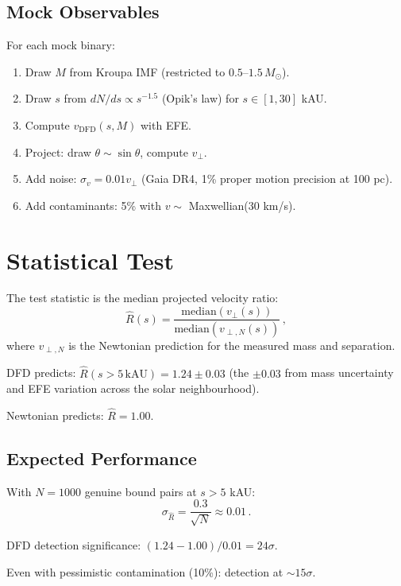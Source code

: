 \documentclass[11pt,a4paper]{article}
\begin{document}
\subsection{Mock Observables}

For each mock binary:
\begin{enumerate}
\item Draw $M$ from Kroupa IMF (restricted to $0.5$--$1.5\,M_\odot$).
\item Draw $s$ from $dN/ds \propto s^{-1.5}$ (Opik's law) for $s \in [1, 30]$ kAU.
\item Compute $v_{\mathrm{DFD}}(s, M)$ with EFE.
\item Project: draw $\theta \sim \sin\theta$, compute $v_\perp$.
\item Add noise: $\sigma_v = 0.01 v_\perp$ (Gaia DR4, 1\% proper motion precision at 100 pc).
\item Add contaminants: 5\% with $v \sim$ Maxwellian($30$ km/s).
\end{enumerate}

\section{Statistical Test}

The test statistic is the median projected velocity ratio:
\begin{equation}
\hat{R}(s) = \frac{\mathrm{median}(v_\perp(s))}{\mathrm{median}(v_{\perp,N}(s))}\,,
\end{equation}
where $v_{\perp,N}$ is the Newtonian prediction for the measured mass and separation.

DFD predicts: $\hat{R}(s > 5\,\text{kAU}) = 1.24 \pm 0.03$ (the $\pm 0.03$ from mass uncertainty and EFE variation across the solar neighbourhood).

Newtonian predicts: $\hat{R} = 1.00$.

\subsection{Expected Performance}

With $N = 1000$ genuine bound pairs at $s > 5$ kAU:
\begin{equation}
\sigma_{\hat{R}} = \frac{0.3}{\sqrt{N}} \approx 0.01\,.
\end{equation}

DFD detection significance: $(1.24 - 1.00)/0.01 = 24\sigma$.

Even with pessimistic contamination (10\%): detection at $\sim 15\sigma$.
\end{document}
